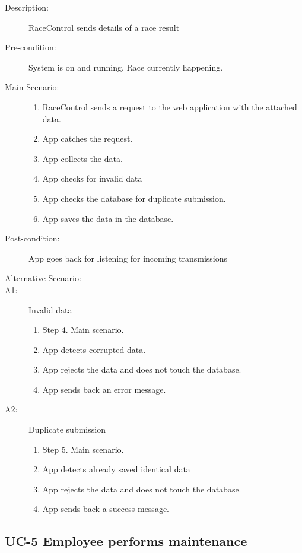 \documentclass{article}
\begin{document}
\begin{description}
    \item[Description:] RaceControl sends details of a race result
    \item[Pre-condition:] System is on and running. Race currently happening.
    \item[Main Scenario:] \hfill
    \begin{enumerate}
        \item RaceControl sends a request to the web application with the attached data.
        \item App catches the request.
        \item App collects the data.
        \item App checks for invalid data
        \item App checks the database for duplicate submission.
        \item App saves the data in the database.
    \end{enumerate}
    \item[Post-condition:] App goes back for listening for incoming transmissions
    \item[Alternative Scenario:] \hfill
    \item[A1:] Invalid data
    \begin{enumerate}
        \item Step 4. Main scenario.
        \item App detects corrupted data.
        \item App rejects the data and does not touch the database.
        \item App sends back an error message.
    \end{enumerate}
    \item[A2:] Duplicate submission
    \begin{enumerate}
        \item Step 5. Main scenario.
        \item App detects already saved identical data
        \item App rejects the data and does not touch the database.
        \item App sends back a success message.
    \end{enumerate}
\end{description}

\newpage

\subsection{UC-5 Employee performs maintenance}
\end{document}
